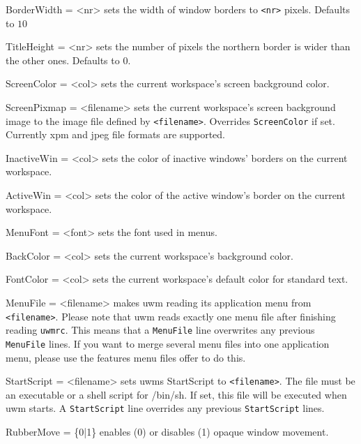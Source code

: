 \documentclass[10pt,a4paper]{article}
\newenvironment{ttdesc}[1]{
   \begin{list}{}{
          \renewcommand{\makelabel}[1]{\texttt{##1\hfill}}}}{\end{list}}
\begin{document}
\begin{ttdesc}{description}

\item[BorderWidth = <nr>] sets the width of window borders to \texttt{<nr>} pixels. Defaults to $10$

\item[TitleHeight = <nr>] sets the number of pixels the northern border is wider than the other ones. Defaults to $0$.

\item[ScreenColor = <col>] sets the current workspace's screen background color.

\item[ScreenPixmap = <filename>] sets the current workspace's screen background image to the image file defined by \texttt{<filename>}. Overrides \texttt{ScreenColor} if set. Currently xpm and jpeg file formats are supported.

\item[InactiveWin = <col>] sets the color of inactive windows' borders on the current workspace.

\item[ActiveWin = <col>] sets the color of the active window's border on the current workspace.

\item[MenuFont = <font>] sets the font used in menus.

\item[BackColor = <col>] sets the current workspace's background color.

\item[FontColor = <col>] sets the current workspace's default color for standard text.

\item[MenuFile = <filename>] makes uwm reading its application menu from \texttt{<filename>}. Please note that uwm reads exactly one menu file after finishing reading \texttt{uwmrc}. This means that a \texttt{MenuFile} line overwrites any previous \texttt{MenuFile} lines. If you want to merge several menu files into one application menu, please use the features menu files offer to do this.

\item[StartScript = <filename>] sets uwms StartScript to \texttt{<filename>}. The file must be an executable or a shell script for /bin/sh. If set, this file will be executed when uwm starts. A \texttt{StartScript} line overrides any previous \texttt{StartScript} lines.

\item[RubberMove = \{0|1\}] enables (0) or disables (1) opaque window movement.


\end{ttdesc}
\end{document}
